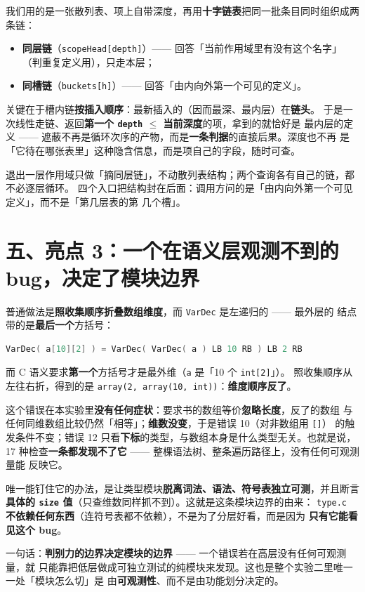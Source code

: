 \documentclass[11pt,a4paper]{ctexart}
\newcommand{\code}[1]{\texttt{#1}}
\begin{document}
我们用的是一张散列表、项上自带深度，再用\textbf{十字链表}把同一批条目同时组织成两条链：

\begin{itemize}
\item \textbf{同层链}（\code{scopeHead[depth]}）—— 回答「当前作用域里有没有这个名字」
（判重复定义用），只走本层；
\item \textbf{同槽链}（\code{buckets[h]}）—— 回答「由内向外第一个可见的定义」。
\end{itemize}

关键在于槽内链\textbf{按插入顺序}：最新插入的（因而最深、最内层）在\textbf{链头}。
于是一次线性走链、返回\textbf{第一个 \code{depth} $\le$ 当前深度}的项，拿到的就恰好是
最内层的定义 —— 遮蔽不再是循环次序的产物，而是\textbf{一条判据}的直接后果。深度也不再
是「它待在哪张表里」这种隐含信息，而是项自己的字段，随时可查。

退出一层作用域只做「摘同层链」，不动散列表结构；两个查询各有自己的链，都不必逐层循环。
四个入口把结构封在后面：调用方问的是「由内向外第一个可见定义」，而不是「第几层表的第
几个槽」。

\section*{五、亮点 3：一个在语义层\textbf{观测不到}的 bug，决定了模块边界}

普通做法是\textbf{照收集顺序折叠数组维度}，而 \code{VarDec} 是左递归的 —— 最外层的
结点带的是\textbf{最后一个}方括号：

\begin{lstlisting}[language=C]
VarDec( a[10][2] ) = VarDec( VarDec( a ) LB 10 RB ) LB 2 RB
\end{lstlisting}

而 C 语义要求\textbf{第一个}方括号才是最外维（\code{a} 是「10 个 \code{int[2]}」）。
照收集顺序从左往右折，得到的是 \code{array(2, array(10, int))}：\textbf{维度顺序反了}。

这个错误在本实验里\textbf{没有任何症状}：要求书的数组等价\textbf{忽略长度}，反了的数组
与任何同维数组比较仍然「相等」；\textbf{维数没变}，于是错误 10（对非数组用 \code{[]}）
的触发条件不变；错误 12 只看\textbf{下标}的类型，与数组本身是什么类型无关。也就是说，
17 种检查\textbf{一条都发现不了它} —— 整棵语法树、整条遍历路径上，没有任何可观测量能
反映它。

唯一能钉住它的办法，是让类型模块\textbf{脱离词法、语法、符号表独立可测}，并且断言
\textbf{具体的 \code{size} 值}（只查维数同样抓不到）。这就是这条模块边界的由来：
\code{type.c} \textbf{不依赖任何东西}（连符号表都不依赖），不是为了分层好看，而是因为
\textbf{只有它能看见这个 bug}。

一句话：\textbf{判别力的边界决定模块的边界} —— 一个错误若在高层没有任何可观测量，就
只能靠把低层做成可独立测试的纯模块来发现。这也是整个实验二里唯一一处「模块怎么切」是
由\textbf{可观测性}、而不是由功能划分决定的。
\end{document}
